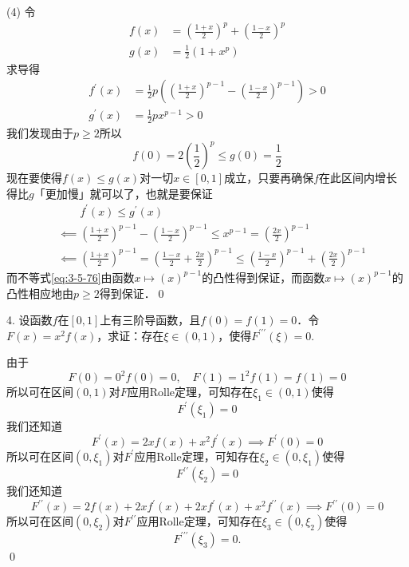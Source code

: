 (4) \prove 令
\begin{align}
    f(x) &= \left(\frac{1+x}{2}\right)^p + \left(\frac{1-x}{2}\right)^p \\
    g(x) &= \frac{1}{2} \left(1+x^p\right)
\end{align}
求导得
\begin{align}
    f^\prime (x) &= \frac{1}{2}p\left(\left(\frac{1+x}{2}\right)^{p-1}-\left(\frac{1-x}{2}\right)^{p-1}\right) > 0 \\
    g^\prime (x) &= \frac{1}{2}px^{p-1} > 0
\end{align}
我们发现由于$p \geq 2$所以
\begin{equation}
    f(0) = 2 \left(\frac{1}{2}\right)^p \leq g(0) = \frac{1}{2}
\end{equation}
现在要使得$f(x) \leq g(x)$对一切$x \in [0,1]$成立，只要再确保$f$在此区间内增长得比$g$「更加慢」就可以了，也就是要保证
\begin{align}
    &\mathrel{\phantom{\impliedby}} f^\prime (x) \leq g^{\prime} (x) \\
    &\impliedby \left(\frac{1+x}{2}\right)^{p-1} - \left(\frac{1-x}{2}\right)^{p-1} \leq x^{p-1} = \left(\frac{2x}{2}\right)^{p-1} \\
    &\impliedby \left(\frac{1+x}{2}\right)^{p-1} = \left(\frac{1-x}{2} + \frac{2x}{2}\right)^{p-1} \leq \left(\frac{1-x}{2}\right)^{p-1} + \left(\frac{2x}{2}\right)^{p-1} \label{eq:3-5-76}
\end{align}
而不等式\ref{eq:3-5-76}由函数$x \mapsto \left(x\right)^{p-1}$的凸性得到保证，而函数$x \mapsto \left(x\right)^{p-1}$的凸性相应地由$p \geq 2$得到保证．\qed\bigskip

4. 设函数$f$在$[0,1]$上有三阶导函数，且$f(0)=f(1)=0$．令$F(x)=x^2 f(x)$，求证：存在$\xi \in (0,1)$，使得$F^{\prime\prime\prime}(\xi)=0$.

\prove 由于
\begin{equation}
    F(0) = 0^2 f(0) = 0, \quad F(1) = 1^2 f(1) = f(1) = 0
\end{equation}
所以可在区间$(0,1)$对$F$应用Rolle定理，可知存在$\xi_1 \in (0,1)$使得
\begin{equation}
    F^{\prime}(\xi_1) = 0
\end{equation}
我们还知道
\begin{equation}
    F^\prime (x) = 2x f(x) + x^2 f^{\prime} (x) \implies F^\prime (0) = 0
\end{equation}
所以可在区间$(0, \xi_1)$对$F^\prime$应用Rolle定理，可知存在$\xi_2 \in (0, \xi_1)$使得
\begin{equation}
    F^{\prime\prime}(\xi_2) = 0
\end{equation}
我们还知道
\begin{equation}
    F^{\prime\prime}(x) = 2f(x) + 2xf^{\prime}(x) + 2x f^{\prime}(x) + x^2 f^{\prime\prime}(x) \implies F^{\prime\prime}(0) = 0
\end{equation}
所以可在区间$(0, \xi_2)$对$F^{\prime\prime}$应用Rolle定理，可知存在$\xi_3 \in (0, \xi_2)$使得
\begin{equation}
    F^{\prime\prime\prime}(\xi_3) = 0.
\end{equation}
\qed\bigskip

